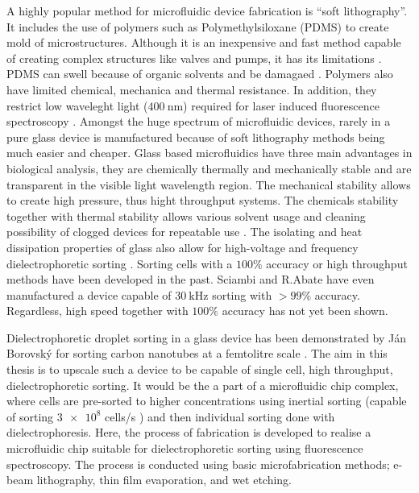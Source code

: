 \documentclass[final]{jyflluk}
\begin{document}
A highly popular method for microfluidic device fabrication is “soft lithography”. It includes the use of polymers such as Polymethylsiloxane (PDMS) to create mold of microstructures. Although it is an inexpensive and fast method capable of creating complex structures like valves and pumps, it has its limitations \cite{xia_soft_1998,tian2008introduction, pethig_review_2010, grover_monolithic_2003}. PDMS can swell because of organic solvents and be damagaed \cite{lee_solvent_2003}. Polymers also have limited chemical, mechanica and thermal resistance. In addition, they restrict low waveleght light ($\SI{400}{\nano \metre}$) required for laser induced fluorescence spectroscopy \cite{tian2008introduction,stankova_optical_2016}. Amongst the huge spectrum of microfluidic devices, rarely in a pure glass device is manufactured because of soft lithography methods being much easier and cheaper. Glass based microfluidics have three main advantages in biological analysis, they are chemically thermally and mechanically stable and are transparent in the visible light wavelength region. The mechanical stability allows to create high pressure, thus hight throughput systems. The chemicals stability together with thermal stability allows various solvent usage and cleaning possibility of clogged devices for repeatable use \cite{ofner_high-throughput_2017}. The isolating and heat dissipation properties of glass also allow for high-voltage and frequency dielectrophoretic sorting \cite{effenhauser_high-speed_1994}.
Sorting cells with a $100 \percent$ accuracy \cite{takahashi_non-destructive_2004, thomas_imagebased_2019} or high throughput methods \cite{zhang_towards_2015} have been developed in the past. Sciambi and R.Abate have even manufactured a device capable of $\SI{30}{\kilo \Hz}$ sorting with $>99 \percent$ accuracy. Regardless, high speed together with $100\percent$ accuracy has not yet been shown.

Dielectrophoretic droplet sorting in a glass device has been demonstrated by Ján Borovský for sorting carbon nanotubes at a femtolitre scale \cite{borovsky}. The aim in this thesis is to upscale such a device to be capable of single cell, high throughput, dielectrophoretic sorting. It would be the a part of a microfluidic chip complex, where cells are pre-sorted to higher concentrations using inertial sorting (capable of sorting $\num{3e8}$ cells/s \cite{edd_microfluidic_2020}) and then individual sorting done with dielectrophoresis. Here, the process of fabrication is developed to realise a microfluidic chip suitable for dielectrophoretic sorting using fluorescence spectroscopy. The process is conducted using basic microfabrication methods; e-beam lithography, thin film evaporation, and wet etching.
\end{document}
